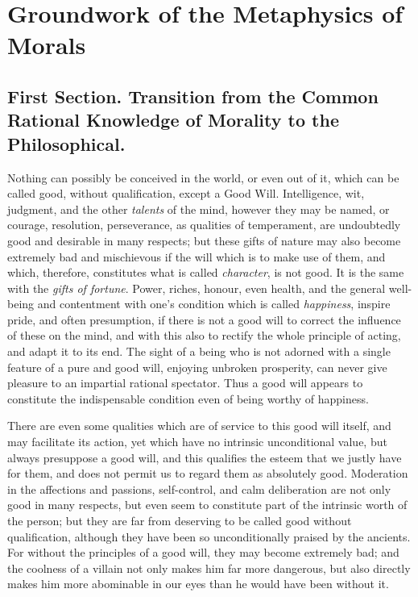 
\author{Immanuel Kant}
\chapter[Groundwork of the Metaphysics of Morals, excerpt]{Groundwork
of the Metaphysics of Morals}

\section{First Section. Transition from the Common Rational
Knowledge of Morality to the Philosophical.}

Nothing can possibly be conceived in the world, or even out of it,
which can be called good, without qualification, except a Good Will.
Intelligence, wit, judgment, and the other \textit{talents} of the
mind, however they may be named, or courage, resolution, perseverance,
as qualities of temperament, are undoubtedly good and desirable in
many respects; but these gifts of nature may also become extremely bad
and mischievous if the will which is to make use of them, and which,
therefore, constitutes what is called \textit{character}, is not good.
It is the same with the \textit{gifts of fortune}. Power, riches,
honour, even health, and the general well-being and contentment with
one's condition which is called \textit{happiness}, inspire pride, and
often presumption, if there is not a good will to correct the
influence of these on the mind, and with this also to rectify the
whole principle of acting, and adapt it to its end. The sight of a
being who is not adorned with a single feature of a pure and good
will, enjoying unbroken prosperity, can never give pleasure to an
impartial rational spectator. Thus a good will appears to constitute
the indispensable condition even of being worthy of happiness.

There are even some qualities which are of service to this good will
itself, and may facilitate its action, yet which have no intrinsic
unconditional value, but always presuppose a good will, and this
qualifies the esteem that we justly have for them, and does not permit
us to regard them as absolutely good. Moderation in the affections and
passions, self-control, and calm deliberation are not only good in
many respects, but even seem to constitute part of the intrinsic worth
of the person; but they are far from deserving to be called good
without  qualification, although they have been so
unconditionally praised by the ancients. For without the principles of
a good will, they may become extremely bad; and the coolness of a
villain not only makes him far more dangerous, but also directly makes
him more abominable in our eyes than he would have been without it.

